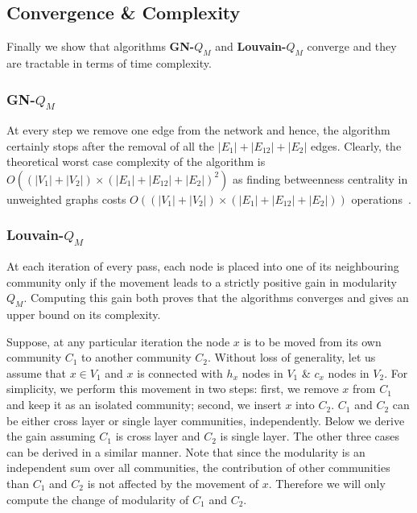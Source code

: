 \subsection{Convergence \& Complexity}
Finally we show that algorithms \textbf{GN-$Q_M$} and \textbf{Louvain-$Q_M$}
converge and they are tractable in terms of time complexity.

\subsubsection{\textbf{GN-$Q_M$}} At every step we remove one edge from the network and hence, the algorithm certainly stops
after the removal of all the $\left \vert E_1 \right \vert + \left \vert E_{12} \right \vert+ \left \vert E_2 \right \vert$ edges.
Clearly, the theoretical worst case complexity of the algorithm is
$O((\left \vert V_1 \right \vert + \left \vert V_2 \right \vert)\times(\left \vert E_1 \right \vert +
\left \vert E_{12} \right \vert+ \left \vert E_2 \right \vert)^2)$ as finding betweenness centrality in unweighted graphs
costs $O((\left \vert V_1 \right \vert + \left \vert V_2 \right \vert)\times(\left \vert E_1 \right \vert +
\left \vert E_{12} \right \vert+ \left \vert E_2 \right \vert))$ operations~\cite{PhysRevE.64.016132}.



\subsubsection{\textbf{Louvain-$Q_M$}} At each iteration of every pass, each node is placed
into one of its neighbouring community only if the movement leads to a
strictly positive gain in modularity $Q_M$. Computing this gain both proves
that the algorithms converges and gives an upper bound on its complexity.

Suppose, at any particular iteration the node $x$ is to be moved from its own
community $C_1$ to another community $C_2$. Without loss of generality, let us
assume that $x \in V_1$ and $x$ is connected with $h_x$ nodes in $V_1$ \& $c_x$
nodes in $V_2$. For simplicity, we perform this movement in two steps: first, we
remove $x$ from $C_1$ and keep it as an isolated community; second,
we insert $x$ into $C_2$. $C_1$ and $C_2$ can be either cross layer or
single layer communities, independently. Below we derive the gain assuming
$C_1$ is cross layer and $C_2$ is single layer. The other three cases can be
derived in a similar manner. Note that since the
modularity is an independent sum over all communities, the contribution of other communities
than $C_1$ and $C_2$ is not affected by the movement of $x$. Therefore we will only compute
the change of modularity of $C_1$ and $C_2$.

